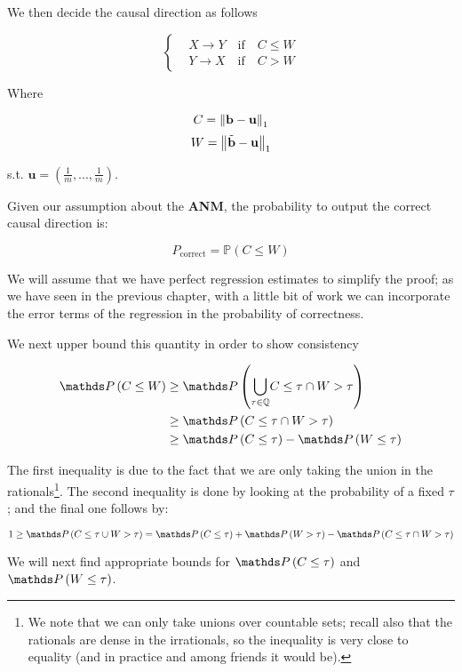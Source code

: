 We then decide the causal direction as follows

\[ \begin{cases} 
    & X \rightarrow Y \quad \text{if} \quad C \leq W  \\
    & Y \rightarrow X \quad \text{if} \quad C > W  
 \end{cases}
\]

Where 

$$
    C = \left\lVert\mathbf{b} - \mathbf{u}\right\rVert_{1} 
$$
$$
    W = \left\lVert\tilde{\mathbf{b}} - \mathbf{u}\right\rVert_{1}
$$


s.t. $\mathbf{u} = (\frac{1}{m}, ..., \frac{1}{m})$.

Given our assumption about the \textbf{ANM}, the probability to output the correct causal direction is:

$$
   P_{\text{correct}} = \mathbb{P}\left(C \leq W\right) 
$$

We will assume that we have perfect regression estimates to simplify the proof; as we have seen in the 
previous chapter, with a little bit of work we can incorporate the error terms of the regression in 
the probability of correctness. 

We next upper bound this quantity in order to show consistency

\begin{align}
    \Prob\left(C \leq W\right) &\geq \Prob\left( \underset{\tau \in \mathbb{Q}}{\bigcup} C \leq \tau \cap W > \tau \right) \\
    &\geq \Prob\left(C \leq \tau \cap W > \tau \right) \\
    &\geq \Prob\left(C \leq \tau \right) - \Prob\left(W \leq \tau \right)
\end{align}

The first inequality is due to the fact that we are only taking the union in the rationals\footnote{We note that
we can only take unions over countable sets; recall also that the rationals are dense in the irrationals, so the
inequality is very close to equality (and in practice and among friends it would be).}. The second inequality is done by 
looking at the probability of a fixed $\tau$; and the final one follows by:

$$
    1 \geq \Prob\left( C \leq \tau \cup W > \tau \right) = 
    \Prob\left( C \leq \tau \right) + \Prob\left( W > \tau \right) - \Prob\left( C \leq \tau \cap W > \tau \right)
$$

We will next find appropriate bounds for $\Prob\left( C \leq \tau \right)$ and $\Prob\left(W \leq \tau \right)$.


